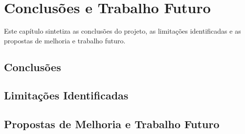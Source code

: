 

\chapter{Conclusões e Trabalho Futuro}
\label{chapter:conclusions}

\begin{introduction}
Este capítulo sintetiza as conclusões do projeto, as limitações identificadas e as propostas de melhoria e trabalho futuro.
\end{introduction}



\section{Conclusões}
\label{sec:conclusoes}


\section{Limitações Identificadas}
\label{sec:limitacoes}


\section{Propostas de Melhoria e Trabalho Futuro}
\label{sec:trabalho-futuro}

